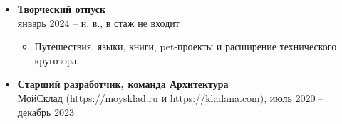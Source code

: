 \documentclass[letterpaper, 11pt]{article}
\begin{document}
    \begin{itemize}
        \item
            \textbf{Творческий отпуск} \\
            \footnotesize
                январь 2024 -- н. в., в стаж не входит
            \normalsize

            \begin{itemize}
                \item
                    Путешествия, языки, книги, pet-проекты и расширение технического кругозора.
            \end{itemize}

        \item
            \textbf{Старший разработчик, команда Архитектура} \\
            \footnotesize
                МойСклад (\url{https://moysklad.ru} и \url{https://kladana.com}), июль 2020 -- декабрь 2023
            \normalsize


\end{itemize}
\end{document}
